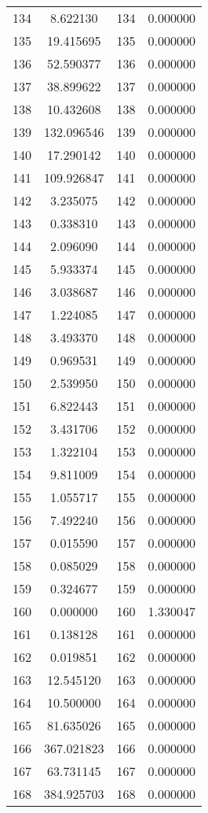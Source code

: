 \documentclass[12pt]{article}
\begin{document}
\begin{longtable}{@{}cccc@{}}
134 & 8.622130 & 134 & 0.000000 \\
135 & 19.415695 & 135 & 0.000000 \\
136 & 52.590377 & 136 & 0.000000 \\
137 & 38.899622 & 137 & 0.000000 \\
138 & 10.432608 & 138 & 0.000000 \\
139 & 132.096546 & 139 & 0.000000 \\
140 & 17.290142 & 140 & 0.000000 \\
141 & 109.926847 & 141 & 0.000000 \\
142 & 3.235075 & 142 & 0.000000 \\
143 & 0.338310 & 143 & 0.000000 \\
144 & 2.096090 & 144 & 0.000000 \\
145 & 5.933374 & 145 & 0.000000 \\
146 & 3.038687 & 146 & 0.000000 \\
147 & 1.224085 & 147 & 0.000000 \\
148 & 3.493370 & 148 & 0.000000 \\
149 & 0.969531 & 149 & 0.000000 \\
150 & 2.539950 & 150 & 0.000000 \\
151 & 6.822443 & 151 & 0.000000 \\
152 & 3.431706 & 152 & 0.000000 \\
153 & 1.322104 & 153 & 0.000000 \\
154 & 9.811009 & 154 & 0.000000 \\
155 & 1.055717 & 155 & 0.000000 \\
156 & 7.492240 & 156 & 0.000000 \\
157 & 0.015590 & 157 & 0.000000 \\
158 & 0.085029 & 158 & 0.000000 \\
159 & 0.324677 & 159 & 0.000000 \\
160 & 0.000000 & 160 & 1.330047 \\
161 & 0.138128 & 161 & 0.000000 \\
162 & 0.019851 & 162 & 0.000000 \\
163 & 12.545120 & 163 & 0.000000 \\
164 & 10.500000 & 164 & 0.000000 \\
165 & 81.635026 & 165 & 0.000000 \\
166 & 367.021823 & 166 & 0.000000 \\
167 & 63.731145 & 167 & 0.000000 \\
168 & 384.925703 & 168 & 0.000000 \\

\end{longtable}
\end{document}
